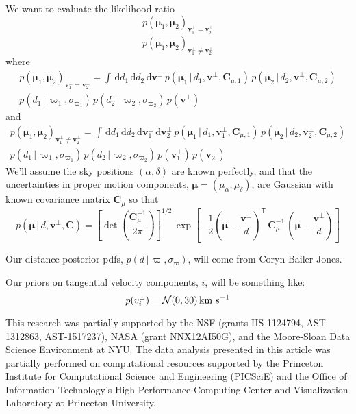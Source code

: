 \documentclass[manuscript, letterpaper]{aastex6}
\newcommand{\acronym}[1]{{\small{#1}}}
\newcommand{\given}{\,|\,}
\newcommand{\dd}{\mathrm{d}}
\newcommand{\transp}[1]{{#1}^{\mathsf{T}}}
\newcommand{\bs}[1]{\boldsymbol{#1}}
\newcommand{\vperp}{\bs{v}^\perp}
\newcommand{\propm}{\bs{\mu}}
\newcommand{\matrx}[1]{\mathbf{#1}}
\newcommand{\kms}{\rm km~s^{-1}}
\begin{document}
We want to evaluate the likelihood ratio
\begin{equation}
  \frac{p(\propm_1, \propm_2)_{\vperp_1 = \vperp_2}}
  {p(\propm_1, \propm_2)_{\vperp_1 \neq \vperp_2}}
\end{equation}
where
\begin{multline}
  p(\propm_1, \propm_2)_{\vperp_1 = \vperp_2} =
    \int \, \dd d_1 \, \dd d_2 \, \dd \vperp \,
    p(\propm_1 \given d_1, \vperp, \matrx{C}_{\mu,1}) \,
    p(\propm_2 \given d_2, \vperp, \matrx{C}_{\mu,2}) \\
    p(d_1 \given \varpi_1, \sigma_{\varpi_1}) \,
    p(d_2 \given \varpi_2, \sigma_{\varpi_2}) \,
    p(\vperp)
\end{multline}
and
\begin{multline}
  p(\propm_1, \propm_2)_{\vperp_1 \neq \vperp_2} =
    \int \, \dd d_1 \, \dd d_2 \, \dd \vperp_1 \, \dd \vperp_2 \,
    p(\propm_1 \given d_1, \vperp_1, \matrx{C}_{\mu,1}) \,
    p(\propm_2 \given d_2, \vperp_2, \matrx{C}_{\mu,2}) \\
    p(d_1 \given \varpi_1, \sigma_{\varpi_1}) \,
    p(d_2 \given \varpi_2, \sigma_{\varpi_2}) \,
    p(\vperp_1) \, p(\vperp_2)
\end{multline}
We'll assume the sky positions $(\alpha, \delta)$ are known perfectly, and that
the uncertainties in proper motion components, $\propm=(\mu_\alpha,
\mu_\delta)$, are Gaussian with known covariance matrix $\matrx{C}_\mu$ so that
\begin{equation}
  p(\propm \given d, \vperp, \matrx{C}) = \left[\det\left(\frac{\matrx{C}_\mu^{-1}}{2\pi}\right)\right]^{1/2} \, \exp \left[ -\frac{1}{2} \transp{\left(\propm - \frac{\vperp}{d}\right)} \, \matrx{C}_\mu^{-1} \, \left(\propm - \frac{\vperp}{d}\right) \right]
\end{equation}

Our distance posterior pdfs, $p(d \given \varpi, \sigma_\varpi)$, will come from
Coryn Bailer-Jones.

Our priors on tangential velocity components, $i$, will be something like:
\begin{equation}
  p(v^\perp_i) = \mathcal{N}(0, 30) \, \kms
\end{equation}

\acknowledgements

This research was partially supported by the \acronym{NSF} (grants
  \acronym{IIS-1124794}, \acronym{AST-1312863}, \acronym{AST-1517237}),
  \acronym{NASA} (grant \acronym{NNX12AI50G}),
  and the Moore-Sloan Data Science Environment at \acronym{NYU}. The data
analysis presented in this article was partially performed on computational
resources supported by the Princeton Institute for Computational Science and
Engineering (PICSciE) and the Office of Information Technology's High
Performance Computing Center and Visualization Laboratory at Princeton
University.
\end{document}
